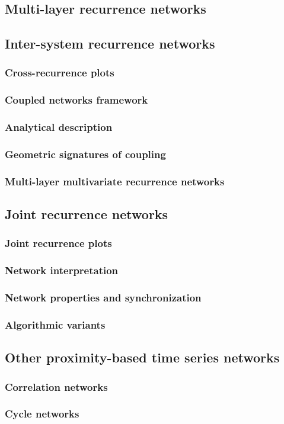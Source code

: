 	\subsection{Multi-layer recurrence networks}

	\subsection{Inter-system recurrence networks}
		\subsubsection{Cross-recurrence plots}
		\subsubsection{Coupled networks framework}
		\subsubsection{Analytical description}
		\subsubsection{Geometric signatures of coupling}
		\subsubsection{Multi-layer multivariate recurrence networks}

	\subsection{Joint recurrence networks}
		\subsubsection{Joint recurrence plots}
		\subsubsection{Network interpretation}
		\subsubsection{Network properties and synchronization}
		\subsubsection{Algorithmic variants}

	\subsection{Other proximity-based time series networks}
		\subsubsection{Correlation networks}
		\subsubsection{Cycle networks}
